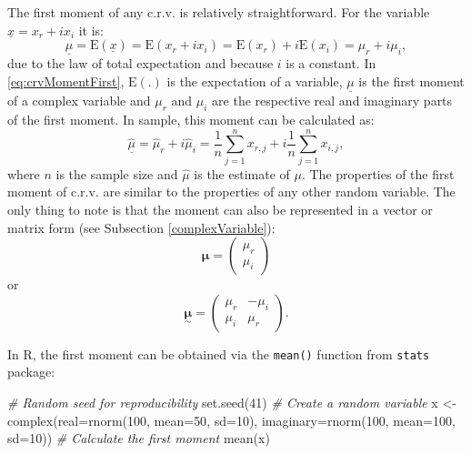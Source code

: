 \documentclass[
]{book}
\newenvironment{Shaded}{\begin{snugshade}}{\end{snugshade}}
\newcommand{\AttributeTok}[1]{\textcolor[rgb]{0.77,0.63,0.00}{#1}}
\newcommand{\CommentTok}[1]{\textcolor[rgb]{0.56,0.35,0.01}{\textit{#1}}}
\newcommand{\DecValTok}[1]{\textcolor[rgb]{0.00,0.00,0.81}{#1}}
\newcommand{\FunctionTok}[1]{\textcolor[rgb]{0.00,0.00,0.00}{#1}}
\newcommand{\NormalTok}[1]{#1}
\newcommand{\OtherTok}[1]{\textcolor[rgb]{0.56,0.35,0.01}{#1}}
\begin{document}
The first moment of any c.r.v. is relatively straightforward. For the variable \(\underline{x}=x_r+ix_i\) it is:
\begin{equation}
    \underline{\mu} = \mathrm{E}(\underline{x}) = \mathrm{E}(x_r + i x_i) = \mathrm{E}(x_r) + i \mathrm{E}(x_i) = \mu_{r} + i \mu_{i},
    \label{eq:crvMomentFirst}
\end{equation}
due to the law of total expectation and because \(i\) is a constant. In \eqref{eq:crvMomentFirst}, \(\mathrm{E}(.)\) is the expectation of a variable, \(\underline{\mu}\) is the first moment of a complex variable and \(\mu_{r}\) and \(\mu_{i}\) are the respective real and imaginary parts of the first moment. In sample, this moment can be calculated as:
\begin{equation}
    \underline{\hat{\mu}} = \hat{\mu}_{r} + i \hat{\mu}_{i} = \frac{1}{n}\sum_{j=1}^n x_{r,j} + i \frac{1}{n}\sum_{j=1}^n x_{i,j},
    \label{eq:crvMomentFirstSample}
\end{equation}
where \(n\) is the sample size and \(\hat{\mu}\) is the estimate of \(\mu\). The properties of the first moment of c.r.v. are similar to the properties of any other random variable. The only thing to note is that the moment can also be represented in a vector or matrix form (see Subsection \ref{complexVariable}):
\begin{equation}
    \boldsymbol{\mu} = \begin{pmatrix} \mu_{r} \\ \mu_{i} \end{pmatrix} 
    \label{eq:crvMomentsVector}
\end{equation}
or
\begin{equation}
    \underset{\sim}{\boldsymbol{\mu}} = \begin{pmatrix} \mu_{r} & - \mu_{i} \\ \mu_{i} & \mu_{r} \end{pmatrix} .
    \label{eq:crvMomentsMatrix}
\end{equation}

In R, the first moment can be obtained via the \texttt{mean()} function from \texttt{stats} package:

\begin{Shaded}
\begin{Highlighting}[]
\CommentTok{\# Random seed for reproducibility}
\FunctionTok{set.seed}\NormalTok{(}\DecValTok{41}\NormalTok{)}
\CommentTok{\# Create a random variable}
\NormalTok{x }\OtherTok{\textless{}{-}} \FunctionTok{complex}\NormalTok{(}\AttributeTok{real=}\FunctionTok{rnorm}\NormalTok{(}\DecValTok{100}\NormalTok{, }\AttributeTok{mean=}\DecValTok{50}\NormalTok{, }\AttributeTok{sd=}\DecValTok{10}\NormalTok{),}
             \AttributeTok{imaginary=}\FunctionTok{rnorm}\NormalTok{(}\DecValTok{100}\NormalTok{, }\AttributeTok{mean=}\DecValTok{100}\NormalTok{, }\AttributeTok{sd=}\DecValTok{10}\NormalTok{))}
\CommentTok{\# Calculate the first moment}
\FunctionTok{mean}\NormalTok{(x)}
\end{Highlighting}
\end{Shaded}
\end{document}
